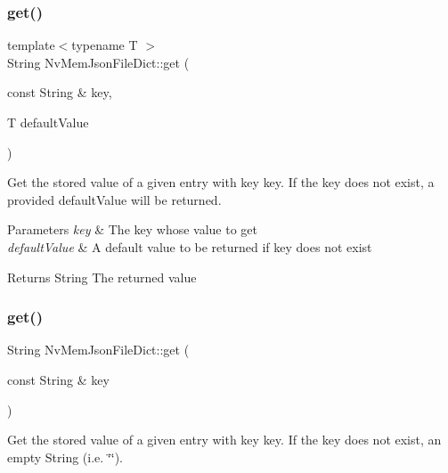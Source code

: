 \subsubsection{\texorpdfstring{get()}{get()}\hspace{0.1cm}{\footnotesize\ttfamily [1/2]}}
{\footnotesize\ttfamily template$<$typename T $>$ \\
String Nv\+Mem\+Json\+File\+Dict\+::get (\begin{DoxyParamCaption}\item[{const String \&}]{key,  }\item[{T}]{default\+Value }\end{DoxyParamCaption})}



Get the stored value of a given entry with key {\ttfamily key}. If the {\ttfamily key} does not exist, a provided {\ttfamily default\+Value} will be returned. 


\begin{DoxyParams}{Parameters}
{\em key} & The key whose value to get \\
\hline
{\em default\+Value} & A default value to be returned if {\ttfamily key} does not exist \\
\hline
\end{DoxyParams}
\begin{DoxyReturn}{Returns}
String The returned value 
\end{DoxyReturn}
\mbox{\label{class_nv_mem_json_file_dict_ab6f75e7c39abfb09f31217d2a4a1ae14}} 
\subsubsection{\texorpdfstring{get()}{get()}\hspace{0.1cm}{\footnotesize\ttfamily [2/2]}}
{\footnotesize\ttfamily String Nv\+Mem\+Json\+File\+Dict\+::get (\begin{DoxyParamCaption}\item[{const String \&}]{key }\end{DoxyParamCaption})\hspace{0.3cm}{\ttfamily [virtual]}}



Get the stored value of a given entry with key {\ttfamily key}. If the {\ttfamily key} does not exist, an empty {\ttfamily String} (i.\+e. {\ttfamily \char`\"{}\char`\"{}}). 


